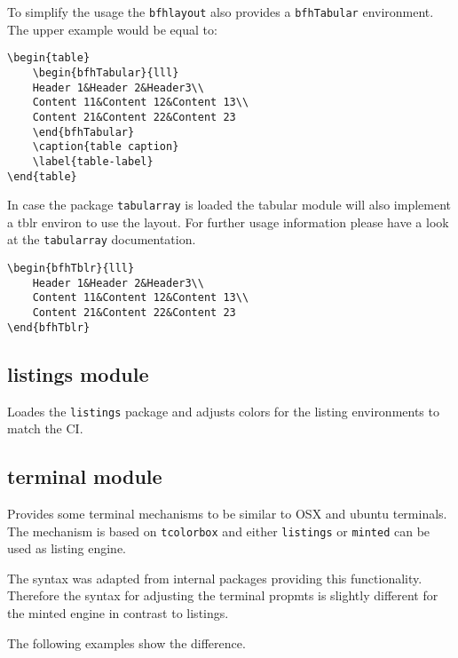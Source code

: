 \documentclass[
]{bfhpub}				%
\newcommand*{\pkg}[1]{\texttt{#1}}
\begin{document}
To simplify the usage the \pkg{bfhlayout} also provides a \verb+bfhTabular+ environment. The upper example would be equal to:

\begin{verbatim}
\begin{table}
	\begin{bfhTabular}{lll}
	Header 1&Header 2&Header3\\
	Content 11&Content 12&Content 13\\
	Content 21&Content 22&Content 23
	\end{bfhTabular}
	\caption{table caption}
	\label{table-label}
\end{table}
\end{verbatim}

In case the package \pkg{tabularray} is loaded the tabular module will also implement a tblr environ to use the layout.
For further usage information please have a look at the \pkg{tabularray} documentation.

\begin{verbatim}
\begin{bfhTblr}{lll}
	Header 1&Header 2&Header3\\
	Content 11&Content 12&Content 13\\
	Content 21&Content 22&Content 23
\end{bfhTblr}
\end{verbatim}

\subsection{listings module}

Loades the \pkg{listings} package and adjusts colors for the listing environments to match the CI.

\subsection{terminal module}

Provides some terminal mechanisms to be similar to OSX and ubuntu terminals.
The mechanism is based on \pkg{tcolorbox} and either \pkg{listings} or \pkg{minted} can be used as listing engine.

The syntax was adapted from internal packages providing this functionality.
Therefore the syntax for adjusting the terminal propmts is slightly different for the minted engine in contrast to listings.

The following examples show the difference.
\end{document}
